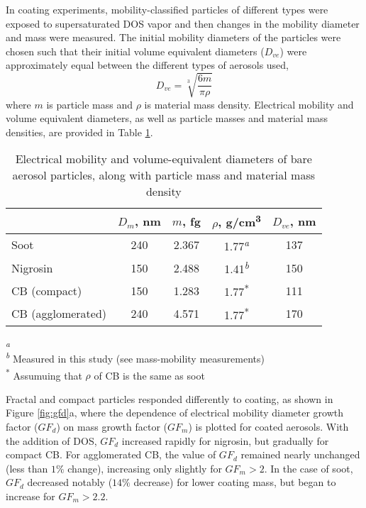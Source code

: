 In coating experiments, mobility-classified particles of different types were exposed to supersaturated DOS vapor and then changes in the mobility diameter and mass were measured. The initial mobility diameters of the particles were chosen such that their initial volume equivalent diameters ($D_{ve}$) were approximately equal between the different types of aerosols used,
\begin{equation}
    \label{eq:diam_ve}
    D_{ve}=\sqrt[3]{\frac{6m}{\pi\rho}}
\end{equation}
where $m$ is particle mass and $\rho$ is material mass density. Electrical mobility and volume equivalent diameters, as well as particle masses and material mass densities, are provided in Table \ref{tab:densities}.

\begin{table}[ht]
\caption{Electrical mobility and volume-equivalent diameters of bare aerosol particles, along with particle mass and material mass density}
\label{tab:densities}
\begin{center}
\begin{tabular}{ l c c c c } 
 \hline
 & $D_m$, nm & $m$, fg & $\rho$, g/cm\textsuperscript{3} & $D_{ve}$, nm\\
 \hline
Soot & 240 & 2.367 & 1.77\textsuperscript{\textit{a}} & 137\\
Nigrosin & 150 & 2.488 & 1.41\textsuperscript{\textit{b}} & 150\\
CB (compact) & 150 & 1.283 & 1.77\textsuperscript{*} & 111\\
CB (agglomerated) & 240 & 4.571 & 1.77\textsuperscript{*} & 170\\
 \hline
\end{tabular}
\end{center}

\textsuperscript{\textit{a}} \citet{park2004measurement}\\
\textsuperscript{\textit{b}} Measured in this study (see mass-mobility measurements)\\
\textsuperscript{*} Assumuing that $\rho$ of CB is the same as soot
\end{table}



Fractal and compact particles responded differently to coating, as shown in Figure \ref{fig:gfd}a, where the dependence of electrical mobility diameter growth factor ($GF_d$) on mass growth factor ($GF_{ m}$) is plotted for coated aerosols. With the addition of DOS, $GF_d$ increased rapidly for nigrosin, but gradually for compact CB. For agglomerated CB, the value of $GF_d$ remained nearly unchanged (less than $1 \%$ change), increasing only slightly for $GF_m > 2$. In the case of soot, $GF_d$ decreased notably ($14\%$ decrease) for lower coating mass, but began to increase for $GF_m > 2.2$.


